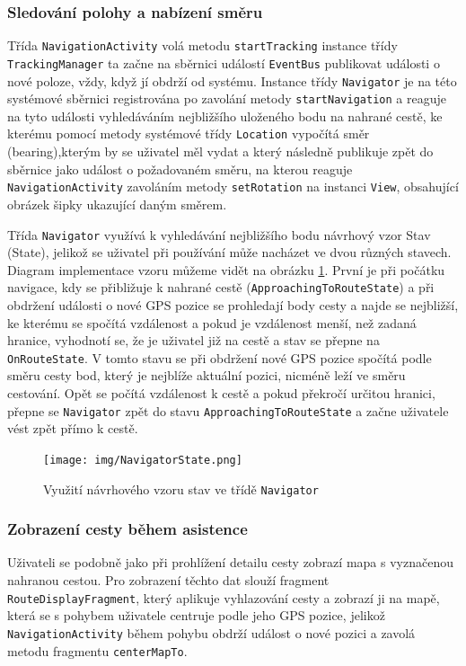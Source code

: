 \documentclass[czech,master,public,dept460,male,java,cpdeclaration]{diploma}
\begin{document}
\subsubsection{Sledování polohy a nabízení směru}
Třída \texttt{NavigationActivity} volá metodu \texttt{startTracking} instance třídy \texttt{TrackingManager}
ta začne na sběrnici událostí \texttt{EventBus} publikovat události o nové poloze, vždy, když jí
obdrží od systému.
Instance třídy \texttt{Navigator} je na této systémové sběrnici registrována po zavolání metody \texttt{startNavigation}
a reaguje na tyto události vyhledáváním nejbližšího uloženého bodu na nahrané cestě, ke kterému pomocí metody
systémové třídy \texttt{Location} vypočítá směr (bearing),kterým by se uživatel měl vydat a který následně publikuje zpět do sběrnice
 jako událost o požadovaném směru, na kterou reaguje \texttt{NavigationActivity} zavoláním metody \texttt{setRotation}
 na instanci \texttt{View}, obsahující obrázek šipky ukazující daným směrem.

Třída \texttt{Navigator} využívá k vyhledávání nejbližšího bodu návrhový vzor Stav (State), jelikož
se uživatel při používání může nacházet ve dvou různých stavech. Diagram implementace vzoru můžeme vidět
na obrázku \ref{fig:navigatorstate}. První je při počátku navigace,
kdy se přibližuje k nahrané cestě (\texttt{ApproachingToRouteState}) a při obdržení události o nové
GPS pozice se prohledají body cesty a najde se nejbližší, ke kterému se spočítá vzdálenost a pokud
je vzdálenost menší, než zadaná hranice, vyhodnotí se, že je uživatel již na cestě a stav se přepne
na \texttt{OnRouteState}.
V tomto stavu se při obdržení nové GPS pozice spočítá podle směru cesty bod, který je nejblíže aktuální pozici,
nicméně leží ve směru cestování. Opět se počítá vzdálenost k cestě a pokud překročí určitou hranici,
přepne se \texttt{Navigator} zpět do stavu \texttt{ApproachingToRouteState} a začne uživatele vést zpět přímo k cestě.

\begin{figure}[H]
        \centering
                \texttt{[image: img/NavigatorState.png]}
        \caption{Využití návrhového vzoru stav ve třídě \texttt{Navigator}}
        \label{fig:navigatorstate}
\end{figure}

\subsubsection{Zobrazení cesty během asistence}
Uživateli se podobně jako při prohlížení detailu cesty zobrazí mapa s vyznačenou nahranou cestou.
Pro zobrazení těchto dat slouží fragment \texttt{RouteDisplayFragment}, který aplikuje vyhlazování cesty
a zobrazí ji na mapě, která se s pohybem uživatele centruje podle jeho GPS pozice, jelikož
\texttt{NavigationActivity} během pohybu obdrží událost o nové pozici a zavolá metodu fragmentu \texttt{centerMapTo}.
\end{document}

